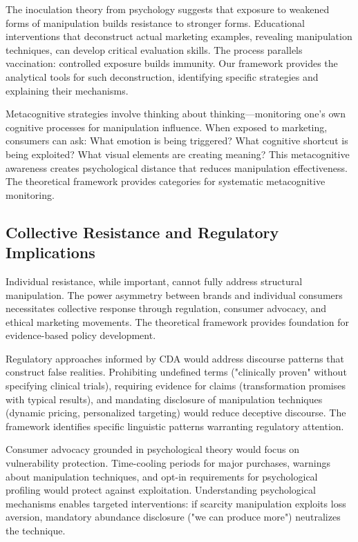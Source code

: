 The inoculation theory from psychology suggests that exposure to weakened forms of manipulation builds resistance to stronger forms. Educational interventions that deconstruct actual marketing examples, revealing manipulation techniques, can develop critical evaluation skills. The process parallels vaccination: controlled exposure builds immunity. Our framework provides the analytical tools for such deconstruction, identifying specific strategies and explaining their mechanisms.

Metacognitive strategies involve thinking about thinking—monitoring one's own cognitive processes for manipulation influence. When exposed to marketing, consumers can ask: What emotion is being triggered? What cognitive shortcut is being exploited? What visual elements are creating meaning? This metacognitive awareness creates psychological distance that reduces manipulation effectiveness. The theoretical framework provides categories for systematic metacognitive monitoring.

\subsection{Collective Resistance and Regulatory Implications}

Individual resistance, while important, cannot fully address structural manipulation. The power asymmetry between brands and individual consumers necessitates collective response through regulation, consumer advocacy, and ethical marketing movements. The theoretical framework provides foundation for evidence-based policy development.

Regulatory approaches informed by CDA would address discourse patterns that construct false realities. Prohibiting undefined terms ("clinically proven" without specifying clinical trials), requiring evidence for claims (transformation promises with typical results), and mandating disclosure of manipulation techniques (dynamic pricing, personalized targeting) would reduce deceptive discourse. The framework identifies specific linguistic patterns warranting regulatory attention.

Consumer advocacy grounded in psychological theory would focus on vulnerability protection. Time-cooling periods for major purchases, warnings about manipulation techniques, and opt-in requirements for psychological profiling would protect against exploitation. Understanding psychological mechanisms enables targeted interventions: if scarcity manipulation exploits loss aversion, mandatory abundance disclosure ("we can produce more") neutralizes the technique.

